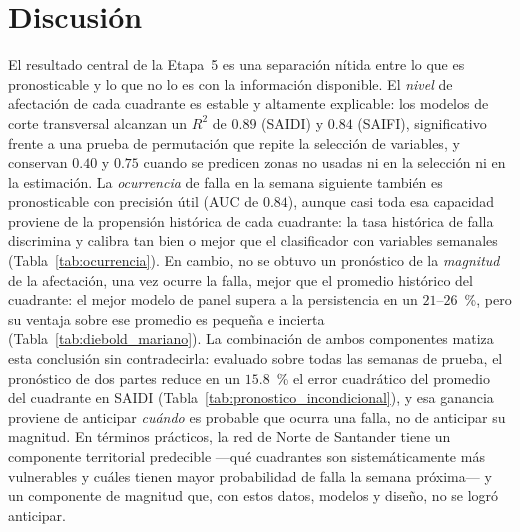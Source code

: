 
\section{Discusión}

El resultado central de la Etapa~5 es una separación nítida entre lo que es pronosticable y lo que no lo es con la información disponible. El \textit{nivel} de afectación de cada cuadrante es estable y altamente explicable: los modelos de corte transversal alcanzan un $R^2$ de $0{.}89$ (SAIDI) y $0{.}84$ (SAIFI), significativo frente a una prueba de permutación que repite la selección de variables, y conservan $0{.}40$ y $0{.}75$ cuando se predicen zonas no usadas ni en la selección ni en la estimación. La \textit{ocurrencia} de falla en la semana siguiente también es pronosticable con precisión útil (AUC de $0{.}84$), aunque casi toda esa capacidad proviene de la propensión histórica de cada cuadrante: la tasa histórica de falla discrimina y calibra tan bien o mejor que el clasificador con variables semanales (Tabla~\ref{tab:ocurrencia}). En cambio, no se obtuvo un pronóstico de la \textit{magnitud} de la afectación, una vez ocurre la falla, mejor que el promedio histórico del cuadrante: el mejor modelo de panel supera a la persistencia en un $21$--$26$~\%, pero su ventaja sobre ese promedio es pequeña e incierta (Tabla~\ref{tab:diebold_mariano}). La combinación de ambos componentes matiza esta conclusión sin contradecirla: evaluado sobre todas las semanas de prueba, el pronóstico de dos partes reduce en un $15{.}8$~\% el error cuadrático del promedio del cuadrante en SAIDI (Tabla~\ref{tab:pronostico_incondicional}), y esa ganancia proviene de anticipar \emph{cuándo} es probable que ocurra una falla, no de anticipar su magnitud. En términos prácticos, la red de Norte de Santander tiene un componente territorial predecible ---qué cuadrantes son sistemáticamente más vulnerables y cuáles tienen mayor probabilidad de falla la semana próxima--- y un componente de magnitud que, con estos datos, modelos y diseño, no se logró anticipar.

